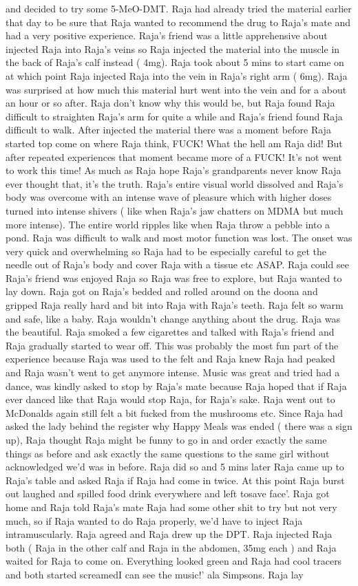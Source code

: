 \documentclass[12pt]{book}
\begin{document}
and decided to try some 5-MeO-DMT. Raja had already tried the material earlier that day to be sure that Raja wanted to recommend the drug to Raja's mate and had a very positive experience. Raja's friend was a little apprehensive about injected Raja into Raja's veins so Raja injected the material into the muscle in the back of Raja's calf instead ( 4mg). Raja took about 5 mins to start came on at which point Raja injected Raja into the vein in Raja's right arm ( 6mg). Raja was surprised at how much this material hurt went into the vein and for a about an hour or so after. Raja don't know why this would be, but Raja found Raja difficult to straighten Raja's arm for quite a while and Raja's friend found Raja difficult to walk. After injected the material there was a moment before Raja started top come on where Raja think, FUCK! What the hell am Raja did! But after repeated experiences that moment became more of a FUCK! It's not went to work this time! As much as Raja hope Raja's grandparents never know Raja ever thought that, it's the truth. Raja's entire visual world dissolved and Raja's body was overcome with an intense wave of pleasure which with higher doses turned into intense shivers ( like when Raja's jaw chatters on MDMA but much more intense). The entire world ripples like when Raja throw a pebble into a pond. Raja was difficult to walk and most motor function was lost. The onset was very quick and overwhelming so Raja had to be especially careful to get the needle out of Raja's body and cover Raja with a tissue etc ASAP. Raja could see Raja's friend was enjoyed Raja so Raja was free to explore, but Raja wanted to lay down. Raja got on Raja's bedded and rolled around on the doona and gripped Raja really hard and bit into Raja with Raja's teeth. Raja felt so warm and safe, like a baby. Raja wouldn't change anything about the drug. Raja was the beautiful. Raja smoked a few cigarettes and talked with Raja's friend and Raja gradually started to wear off. This was probably the most fun part of the experience because Raja was used to the felt and Raja knew Raja had peaked and Raja wasn't went to get anymore intense. Music was great and tried had a dance, was kindly asked to stop by Raja's mate because Raja hoped that if Raja ever danced like that Raja would stop Raja, for Raja's sake. Raja went out to McDonalds again still felt a bit fucked from the mushrooms etc. Since Raja had asked the lady behind the register why Happy Meals was ended ( there was a sign up), Raja thought Raja might be funny to go in and order exactly the same things as before and ask exactly the same questions to the same girl without acknowledged we'd was in before. Raja did so and 5 mins later Raja came up to Raja's table and asked Raja if Raja had come in twice. At this point Raja burst out laughed and spilled food drink everywhere and left tosave face'. Raja got home and Raja told Raja's mate Raja had some other shit to try but not very much, so if Raja wanted to do Raja properly, we'd have to inject Raja intramuscularly. Raja agreed and Raja drew up the DPT. Raja injected Raja both ( Raja in the other calf and Raja in the abdomen, 35mg each ) and Raja waited for Raja to come on. Everything looked green and Raja had cool tracers and both started screamedI can see the music!' ala Simpsons. Raja lay 
\end{document}
